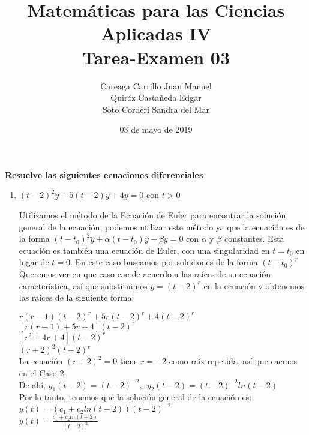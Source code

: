 \documentclass{article}
\title{
    Matemáticas para las Ciencias Aplicadas IV\\
    Tarea-Examen 03 
}
\author{
    Careaga Carrillo Juan Manuel \\
    Quiróz Castañeda Edgar \\
    Soto Corderi Sandra del Mar
}
\date{
    03 de mayo de 2019
}
\begin{document}
    \maketitle
    {\bf Resuelve las siguientes ecuaciones diferenciales}
    \begin{enumerate}
        
        \item {
            $(t - 2)^2 \ddot y + 5(t-2)\dot y+4y=0$ con $t > 0$ \\

            \color{azul}
            
            Utilizamos el método de la Ecuación de Euler para encontrar la solución general de la ecuación, podemos utilizar este método ya que la ecuación es de la forma $(t - t_0)^2\ddot{y} + \alpha (t - t_0) \dot{y} + \beta y = 0$ con $\alpha$ y $\beta$ constantes. Esta ecuación es también una ecuación de Euler, con una singularidad en $t = t_0$ en lugar de $t = 0$. En este caso buscamos por soluciones de la forma $(t - t_0)^r$\\
            
            Queremos ver en que caso cae de acuerdo a las raíces de su ecuación característica, así que substituimos $y = (t-2)^r$ en la ecuación y obtenemos las raíces de la siguiente forma:
            
            $r(r -1)(t -2)^r + 5r(t-2)^r + 4(t-2)^r$\\
            $[r(r-1) + 5r + 4] (t-2)^r$\\
            $[r^2 + 4r + 4] (t-2)^r$\\
            $(r+2)^2(t-2)^r$\\
            
            La ecuación $(r+2)^2 = 0$ tiene $r = -2$ como raíz repetida, así que caemos en el Caso 2.\\
            De ahí, $y_1(t-2) = (t-2)^{-2}, \ \  y_2(t-2) = (t-2)^{-2}ln(t-2)$\\
            
             Por lo tanto, tenemos que la solución general de la ecuación es:\\
            
            $y(t) = (c_1 + c_2 ln(t-2))(t-2)^{-2} $ \\
            
            $y(t) = \frac{c_1 + c_2 ln(t-2)}{(t-2)^2} $\\
            
}
\end{enumerate}
\end{document}
